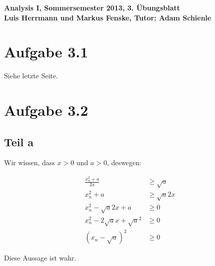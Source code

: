 \documentclass[a4paper,german,12pt,smallheadings]{scrartcl}
\begin{document}
\begin{center}
\bfseries %
\sffamily %
\vspace{-40pt}
Analysis I, Sommersemester 2013, 3. Übungsblatt \\
Luis Herrmann und Markus Fenske, Tutor: Adam Schienle
\vspace{-10pt}
\end{center}

\section*{Aufgabe 3.1}

Siehe letzte Seite.

\section*{Aufgabe 3.2}
\subsection*{Teil a}
Wir wissen, dass $x > 0$ und $a > 0$, deswegen:

\begin{align*}
  \frac{x_n^2 + a}{2x} &\ge \sqrt{a} \\
  x_n^2 + a &\ge \sqrt{a}2x \\
  x_n^2 -\sqrt{a}2x+ a &\ge 0 \\
  x_n^2 - 2\sqrt{a}x+ \sqrt{a}^2 &\ge 0 \\
  (x_n - \sqrt{a})^2 &\ge 0
\end{align*}

Diese Aussage ist wahr.
\end{document}
